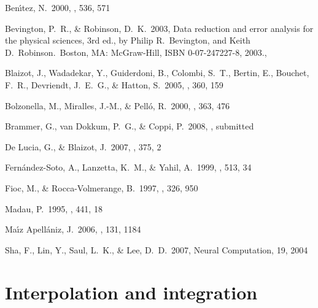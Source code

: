 \documentclass[11pt]{article}
\begin{document}
\begin{thebibliography}{}

 Ben{\'{\i}}tez, N.\ 
2000, \apj, 536, 571 

 Bevington, 
P.~R., \& Robinson, D.~K.\ 2003, Data reduction and error analysis for the 
physical sciences, 3rd ed., by Philip R.~Bevington, and Keith 
D.~Robinson.~Boston, MA: McGraw-Hill, ISBN 0-07-247227-8, 2003., 

 Blaizot, J., Wadadekar, 
Y., Guiderdoni, B., Colombi, S.~T., Bertin, E., Bouchet, F.~R., Devriendt, 
J.~E.~G., \& Hatton, S.\ 2005, \mnras, 360, 159 

 Bolzonella, M., 
Miralles, J.-M., \& Pell{\'o}, R.\ 2000, \aap, 363, 476 

 Brammer, G., van Dokkum, P.~G., \& Coppi, P.\ 2008, \apj, submitted

 De Lucia, G., \& 
Blaizot, J.\ 2007, \mnras, 375, 2 

Fern{\'a}ndez-Soto, A., Lanzetta, K.~M., \& Yahil, A.\ 1999, \apj, 513, 34 

 Fioc, M., \& 
Rocca-Volmerange, B.\ 1997, \aap, 326, 950 

 Madau, P.\ 1995, \apj, 441, 18 

 Ma{\'{\i}}z 
Apell{\'a}niz, J.\ 2006, \aj, 131, 1184 

Sha, F., Lin, Y., Saul, L.~K., \& Lee, D.~D.\ 2007, Neural Computation, 19, 2004

\end{thebibliography}

\appendix

\section{Interpolation and integration \label{details}}

\end{document}
